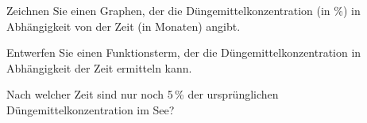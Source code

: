 \begin{bbwAufgabenBlock}

\item Zeichnen Sie einen Graphen, der die Düngemittelkonzentration (in \%)
  in Abhängigkeit von der Zeit (in Monaten) angibt.


  
    \item Entwerfen Sie einen Funktionsterm, der die
      Düngemittelkonzentration in Abhängigkeit der Zeit ermitteln
      kann.


    \item Nach welcher Zeit sind nur noch 5\,\% der ursprünglichen
      Düngemittelkonzentration im See?

      
\end{bbwAufgabenBlock}
\platzFuerBerechnungenBisEndeSeite{}


